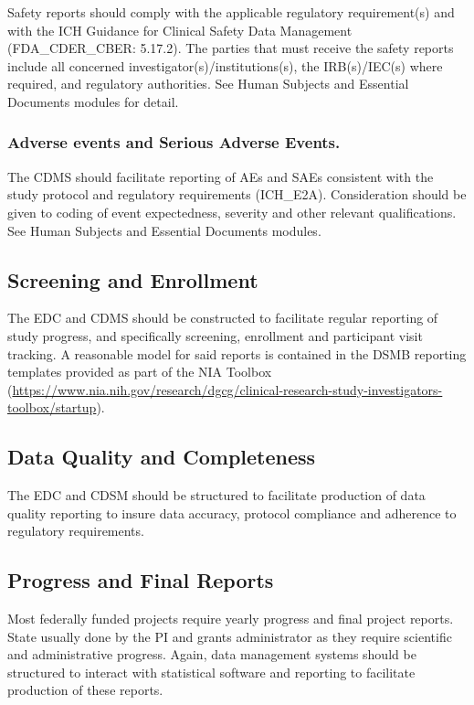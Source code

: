 \documentclass[]{book}
\begin{document}
Safety reports should comply with the applicable regulatory
requirement(s) and with the ICH Guidance for Clinical Safety Data
Management (FDA\_CDER\_CBER: 5.17.2). The parties that must receive the
safety reports include all concerned investigator(s)/institutions(s),
the IRB(s)/IEC(s) where required, and regulatory authorities. See Human
Subjects and Essential Documents modules for detail.

\subsubsection{Adverse events and Serious Adverse
Events.}\label{adverse-events-and-serious-adverse-events.}

The CDMS should facilitate reporting of AEs and SAEs consistent with the
study protocol and regulatory requirements (ICH\_E2A). Consideration
should be given to coding of event expectedness, severity and other
relevant qualifications. See Human Subjects and Essential Documents
modules.

\subsection{Screening and Enrollment}\label{screening-and-enrollment}

The EDC and CDMS should be constructed to facilitate regular reporting
of study progress, and specifically screening, enrollment and
participant visit tracking. A reasonable model for said reports is
contained in the DSMB reporting templates provided as part of the NIA
Toolbox
(\url{https://www.nia.nih.gov/research/dgcg/clinical-research-study-investigators-toolbox/startup}).

\subsection{Data Quality and
Completeness}\label{data-quality-and-completeness}

The EDC and CDSM should be structured to facilitate production of data
quality reporting to insure data accuracy, protocol compliance and
adherence to regulatory requirements.

\subsection{Progress and Final
Reports}\label{progress-and-final-reports}

Most federally funded projects require yearly progress and final project
reports. State usually done by the PI and grants administrator as they
require scientific and administrative progress. Again, data management
systems should be structured to interact with statistical software and
reporting to facilitate production of these reports.
\end{document}
